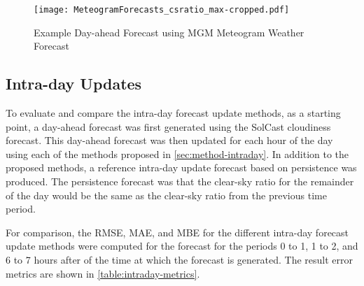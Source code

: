 \begin{figure}[tbh]
	\centering
	\texttt{[image: MeteogramForecasts\_csratio\_max-cropped.pdf]}
	\caption{Example Day-ahead Forecast using MGM Meteogram Weather Forecast}
	\label{fig:dayahead-forecast-meteogram}
\end{figure}


\subsection{Intra-day Updates}

To evaluate and compare the intra-day forecast update methods,
as a starting point, a day-ahead forecast was first generated using the
SolCast cloudiness forecast.
This day-ahead forecast was then updated for each hour of the day using each of the methods proposed in \cref{sec:method-intraday}.
In addition to the proposed methods, a reference intra-day update forecast based on persistence was produced.
The persistence forecast was that the clear-sky ratio for the remainder of the day would be the same as the clear-sky ratio from the previous time period.

For comparison, the RMSE, MAE, and MBE for the different intra-day forecast update methods were computed
for the forecast for the periods 0 to 1, 1 to 2, and 6 to 7 hours after of the time at which the forecast is generated.
The result error metrics are shown in \cref{table:intraday-metrics}.

